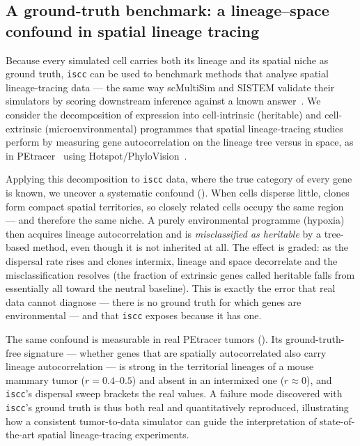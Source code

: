 \documentclass{article}
\begin{document}
\subsection{A ground-truth benchmark: a lineage--space confound in spatial lineage tracing}
\label{sec:petracer}
Because every simulated cell carries both its lineage and its spatial niche as ground truth,
\texttt{iscc} can be used to benchmark methods that analyse spatial lineage-tracing data --- the same
way scMultiSim and SISTEM validate their simulators by scoring downstream inference against a known
answer~\cite{li_scmultisim_2025, weiner_sistem_2025}. We consider the decomposition of expression into
cell-intrinsic (heritable) and cell-extrinsic (microenvironmental) programmes that spatial
lineage-tracing studies perform by measuring gene autocorrelation on the lineage tree versus in space,
as in PEtracer~\cite{koblan_petracer_2025} using Hotspot/PhyloVision~\cite{detomaso_hotspot_2021}.

Applying this decomposition to \texttt{iscc} data, where the true category of every gene is known, we
uncover a systematic confound (). When cells disperse little, clones form compact
spatial territories, so closely related cells occupy the same region --- and therefore the same niche.
A purely environmental programme (hypoxia) then acquires lineage autocorrelation and is
\emph{misclassified as heritable} by a tree-based method, even though it is not inherited at all. The
effect is graded: as the dispersal rate rises and clones intermix, lineage and space decorrelate and
the misclassification resolves (the fraction of extrinsic genes called heritable falls from
essentially all toward the neutral baseline). This is exactly the error that real data cannot
diagnose --- there is no ground truth for which genes are environmental --- and that \texttt{iscc}
exposes because it has one.

The same confound is measurable in real PEtracer tumors (). Its
ground-truth-free signature --- whether genes that are spatially autocorrelated also carry lineage
autocorrelation --- is strong in the territorial lineages of a mouse mammary tumor
($r = 0.4$--$0.5$) and absent in an intermixed one ($r \approx 0$), and \texttt{iscc}'s dispersal
sweep brackets the real values. A failure mode discovered with \texttt{iscc}'s ground truth is thus
both real and quantitatively reproduced, illustrating how a consistent tumor-to-data simulator can
guide the interpretation of state-of-the-art spatial lineage-tracing experiments.
\end{document}
